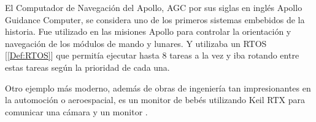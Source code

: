 El Computador de Navegación del Apollo, AGC por sus siglas en inglés Apollo Guidance Computer, se considera uno de los primeros sistemas embebidos de la historia. Fue utilizado en las misiones Apollo para controlar la orientación y navegación de los módulos de mando y lunares. Y utilizaba un RTOS [\ref{Def:RTOS}] que permitía ejecutar hasta 8 tareas a la vez y iba rotando entre estas tareas según la prioridad de cada una.

Otro ejemplo más moderno, además de obras de ingeniería tan impresionantes en la automoción o aeroespacial, es un monitor de bebés  utilizando Keil RTX para comunicar una cámara y un monitor \cite{LLLBabyMonitor}.\\

%

